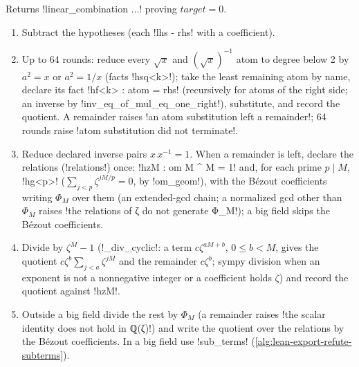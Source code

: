 {{{\begin{algorithm}\label{alg:lean-export-refute-combination}
Returns \lexcode!linear_combination ...! proving $\mathit{target}=0$.
\begin{enumerate}
\item Subtract the hypotheses (each \lexcode!lhs - rhs! with a coefficient).
\item Up to 64 rounds: reduce every $\sqrt x$ and $(\sqrt x)^{-1}$ atom to degree below 2 by
$a^2 = x$ or $a^2 = 1/x$ (facts \lexlean!hsq<k>!); take the least remaining atom by name,
declare its fact \lexlean!hf<k> : atom = rhs! (recursively for atoms of the right side; an inverse
by \lexlean!inv_eq_of_mul_eq_one_right!), substitute, and record the quotient. A remainder raises
\lexcode!an atom substitution left a remainder!; 64 rounds raise
\lexcode!atom substitution did not terminate!.
\item Reduce declared inverse pairs $x\,x^{-1}=1$. When a remainder is left, declare the
relations (\lexpy!relations!) once: \lexlean!hzM : om M ^ M = 1! and, for each prime $p \mid M$,
\lexlean!hg<p>! ($\sum_{j<p}\zeta^{jM/p}=0$, by \lexlean!om_geom!), with the B\'ezout coefficients
writing $\Phi_M$ over them (an extended-gcd chain; a normalized gcd other than $\Phi_M$ raises
\lexcode!the relations of ζ do not generate Φ_M!); a big field skips the B\'ezout
coefficients.
\item Divide by $\zeta^M - 1$ (\lexpy!_div_cyclic!: a term $c\zeta^{aM+b}$, $0 \le b < M$, gives
the quotient $c\zeta^b\sum_{j<a}\zeta^{jM}$ and the remainder $c\zeta^b$; sympy division when an
exponent is not a nonnegative integer or a coefficient holds $\zeta$) and record the quotient
against \lexlean!hzM!.
\item Outside a big field divide the rest by $\Phi_M$ (a remainder raises
\lexcode!the scalar identity does not hold in ℚ(ζ)!) and write the quotient over the
relations by the B\'ezout coefficients. In a big field use \lexpy!sub_terms!
(\cref{alg:lean-export-refute-subterms}).
\end{enumerate}
\end{algorithm}

}}}

